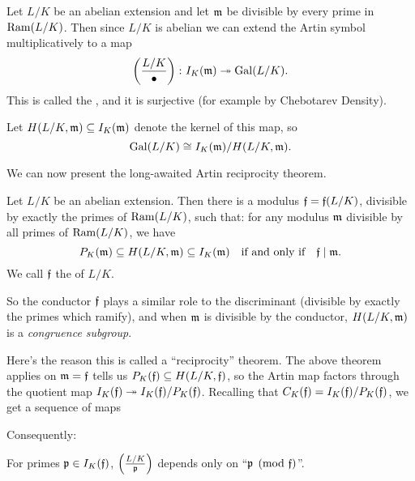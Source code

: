 \begin{definition}
	Let $L/K$ be an abelian extension and let $\mathfrak m$ be
	divisible by every prime in $\operatorname{Ram}(L/K)$.
	Then since $L/K$ is abelian we can extend the Artin symbol
	multiplicatively to a map
	\[ \left( \frac{L/K}{\bullet} \right) \colon I_K(\mathfrak m) \twoheadrightarrow \operatorname{Gal}(L/K). \]
	This is called the ,
	and it is surjective (for example by Chebotarev Density).

	Let $H(L/K, \mathfrak m) \subseteq I_K(\mathfrak m)$ denote the kernel of this map, so
	\[ \operatorname{Gal}(L/K) \cong I_K(\mathfrak m) / H(L/K, \mathfrak m). \]
\end{definition}

We can now present the long-awaited Artin reciprocity theorem.
\begin{theorem}
	Let $L/K$ be an abelian extension.
	Then there is a modulus $\mathfrak f = \mathfrak f(L/K)$,
	divisible by exactly the primes of $\operatorname{Ram}(L/K)$, such that:
	for any modulus $\mathfrak m$ divisible by all primes of $\operatorname{Ram}(L/K)$, we have
	\[
		P_K(\mathfrak m) \subseteq H(L/K, \mathfrak m) \subseteq I_K(\mathfrak m)
		\quad\text{if and only if}\quad
		\mathfrak f \mid \mathfrak m.
	\]
	We call $\mathfrak f$ the  of $L/K$.
\end{theorem}
So the conductor $\mathfrak f$ plays a similar role to the discriminant
(divisible by exactly the primes which ramify),
and when $\mathfrak m$ is divisible by the conductor,
$H(L/K, \mathfrak m)$ is a \emph{congruence subgroup}.

Here's the reason this is called a ``reciprocity'' theorem.
The above theorem applies on $\mathfrak m=\mathfrak f$ tells us $P_K(\mathfrak f) \subseteq H(L/K, \mathfrak f)$,
so the Artin map factors through the quotient map $I_K(\mathfrak f) \twoheadrightarrow I_K(\mathfrak f) / P_K(\mathfrak f)$.
Recalling that $C_K(\mathfrak f) = I_K(\mathfrak f) / P_K(\mathfrak f)$,
we get a sequence of maps
\begin{center}
\end{center}
Consequently:
\begin{moral}
	For primes $\mathfrak p \in I_K(\mathfrak f)$,
	$\left( \frac{L/K}{\mathfrak p} \right)$ depends
	only on ``$\mathfrak p \pmod {\mathfrak f}$''.
\end{moral}

